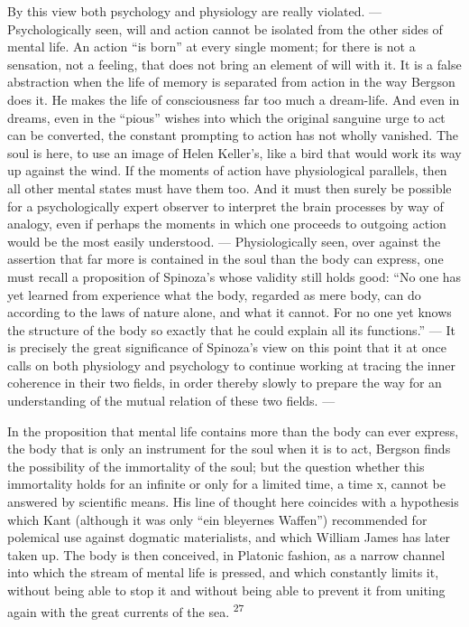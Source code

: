 \documentclass[12pt,a4paper,openany]{book}
\newcommand{\opage}[1]{\marginnote{\footnotesize\textit{[#1]}}}
\newcommand{\nm}[1]{\unskip\textsuperscript{#1}}
\begin{document}
By this view both psychology and physiology are really violated. --- Psychologically seen, will and action cannot be isolated from the other sides of mental life. An action ``is born'' at every single moment; for there is not a sensation, not a feeling, that does not bring an element of will with it. It is a false abstraction when the life of memory is separated from action in the way Bergson does it. He makes the life of consciousness far too much a dream-life. And even in dreams, even in the ``pious'' wishes into which the original sanguine urge to act can be converted, the constant prompting to action has not wholly vanished. The soul is here, to use an image of Helen Keller's, like a bird that would work its way up against the wind. If the moments of action have physiological parallels, then all other mental states must have them too. And it must then surely be possible for a psychologically expert observer to interpret the brain processes %
by way of analogy, even if perhaps the moments in which one proceeds to outgoing action would be the most easily understood. --- Physiologically seen, over against the assertion that far more is contained in the soul than the body can express, one must recall a proposition of Spinoza's whose validity still holds good:
\opage{34}``No one has yet learned from experience what the body, regarded as mere body, can do according to the laws of nature alone, and what it cannot. For no one yet knows the structure of the body so exactly that he could explain all its functions.'' --- It is precisely the great significance of Spinoza's view on this point that it at once calls on both physiology and psychology to continue working at tracing the inner coherence in their two fields, in order thereby slowly to prepare the way for an understanding of the mutual relation of these two fields. ---

In the proposition that mental life contains more than the body can ever express, the body that is only an instrument for the soul when it is to act, Bergson finds the possibility of the immortality of the soul; but the question whether this immortality holds for an infinite or only for a limited time, a time x, cannot be answered by scientific means. His line of thought here coincides with a hypothesis which Kant (although it was only ``ein bleyernes Waffen'') recommended for polemical use against dogmatic materialists, and which William James has later taken up. The body is then conceived, in Platonic fashion, as a narrow channel into which the stream of mental life is pressed, and which constantly limits it, without being able to stop it and without being able to prevent it from uniting again with the great currents of the sea. \nm{27}
\end{document}
